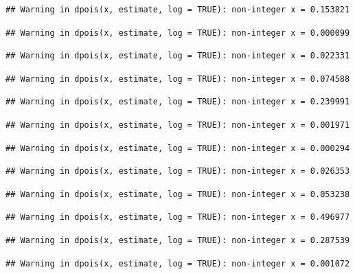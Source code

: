 \documentclass[]{article}
\begin{document}
\begin{verbatim}
## Warning in dpois(x, estimate, log = TRUE): non-integer x = 0.153821
\end{verbatim}

\begin{verbatim}
## Warning in dpois(x, estimate, log = TRUE): non-integer x = 0.000099
\end{verbatim}

\begin{verbatim}
## Warning in dpois(x, estimate, log = TRUE): non-integer x = 0.022331
\end{verbatim}

\begin{verbatim}
## Warning in dpois(x, estimate, log = TRUE): non-integer x = 0.074588
\end{verbatim}

\begin{verbatim}
## Warning in dpois(x, estimate, log = TRUE): non-integer x = 0.239991
\end{verbatim}

\begin{verbatim}
## Warning in dpois(x, estimate, log = TRUE): non-integer x = 0.001971
\end{verbatim}

\begin{verbatim}
## Warning in dpois(x, estimate, log = TRUE): non-integer x = 0.000294
\end{verbatim}

\begin{verbatim}
## Warning in dpois(x, estimate, log = TRUE): non-integer x = 0.026353
\end{verbatim}

\begin{verbatim}
## Warning in dpois(x, estimate, log = TRUE): non-integer x = 0.053238
\end{verbatim}

\begin{verbatim}
## Warning in dpois(x, estimate, log = TRUE): non-integer x = 0.496977
\end{verbatim}

\begin{verbatim}
## Warning in dpois(x, estimate, log = TRUE): non-integer x = 0.287539
\end{verbatim}

\begin{verbatim}
## Warning in dpois(x, estimate, log = TRUE): non-integer x = 0.001072
\end{verbatim}
\end{document}
